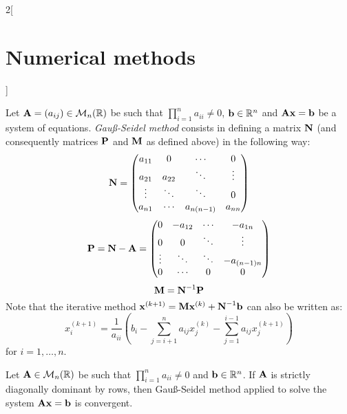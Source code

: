 \documentclass[../../../main.tex]{subfiles}
\begin{document}
\begin{multicols}{2}[\section{Numerical methods}]
\begin{definition}
        Let $\boldsymbol{\mathrm{A}}=(a_{ij})\in\mathcal{M}_n(\mathbb{R})$ be such that $\prod_{i=1}^na_{ii}\ne 0$, $\boldsymbol{\mathrm{b}}\in\mathbb{R}^n$ and $\boldsymbol{\mathrm{A}}\boldsymbol{\mathrm{x}}=\boldsymbol{\mathrm{b}}$ be a system of equations. \textit{Gau\ss-Seidel method} consists in defining a matrix $\boldsymbol{\mathrm{N}}$ (and consequently matrices $\boldsymbol{\mathrm{P}}$ and $\boldsymbol{\mathrm{M}}$ as defined above) in the following way:
        \begin{equation*}
            \boldsymbol{\mathrm{N}}=
            \begin{pmatrix}
                a_{11} & 0      & \cdots     & 0      \\
                a_{21} & a_{22} & \ddots     & \vdots \\
                \vdots & \ddots & \ddots     & 0      \\
                a_{n1} & \cdots & a_{n(n-1)} & a_{nn}
            \end{pmatrix}
        \end{equation*}
        \begin{equation*}
            \boldsymbol{\mathrm{P}}=\boldsymbol{\mathrm{N}}-\boldsymbol{\mathrm{A}}=
            \begin{pmatrix}
                0      & -a_{12} & \cdots & -a_{1n}     \\
                0      & 0       & \ddots & \vdots      \\
                \vdots & \ddots  & \ddots & -a_{(n-1)n} \\
                0      & \cdots  & 0      & 0
            \end{pmatrix}
        \end{equation*}
        \begin{equation*}
            \boldsymbol{\mathrm{M}}=\boldsymbol{\mathrm{N}}^{-1}\boldsymbol{\mathrm{P}}
        \end{equation*}
        Note that the iterative method $\boldsymbol{\mathrm{x}}^{(k+1)}=\boldsymbol{\mathrm{M}}\boldsymbol{\mathrm{x}}^{(k)}+\boldsymbol{\mathrm{N}}^{-1}\boldsymbol{\mathrm{b}}$ can also be written as: $$x_i^{(k+1)}=\frac{1}{a_{ii}}\left(b_i-\sum_{j=i+1}^na_{ij}x_j^{(k)}-\sum_{j=1}^{i-1}a_{ij}x_j^{(k+1)}\right)$$ for $i=1,\ldots,n$.
    \end{definition}
    \begin{theorem}
        Let $\boldsymbol{\mathrm{A}}\in\mathcal{M}_n(\mathbb{R})$ be such that $\prod_{i=1}^na_{ii}\ne 0$ and $\boldsymbol{\mathrm{b}}\in\mathbb{R}^n$. If $\boldsymbol{\mathrm{A}}$ is strictly diagonally dominant by rows, then Gau\ss-Seidel method applied to solve the system $\boldsymbol{\mathrm{A}}\boldsymbol{\mathrm{x}}=\boldsymbol{\mathrm{b}}$ is convergent.

\end{theorem}
\end{multicols}
\end{document}
